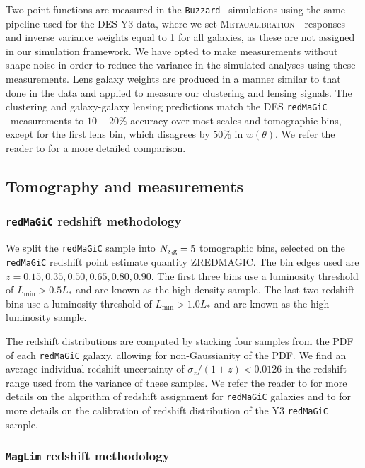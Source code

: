 \documentclass[aps, prd,twocolumn,superscriptaddress,nofootinbib,preprintnumbers]{revtex4-1}
\newcommand{\wtheta}{\ensuremath{w(\theta)}}
\newcommand{\redmagic}{\texttt{redMaGiC} }
\newcommand{\maglim}{\texttt{MagLim} }
\newcommand{\buzzard}{\texttt{Buzzard} }
\newcommand{\metacal}{{\textsc{Metacalibration}~}}
\begin{document}
Two-point functions are measured in the \buzzard\ simulations using the same pipeline used for the DES Y3 data, where we set \metacal\ responses and inverse variance weights equal to 1 for all galaxies, as these are not assigned in our simulation framework. We have opted to make measurements without shape noise in order to reduce the variance in the simulated analyses using these measurements. Lens galaxy weights are produced in a manner similar to that done in the data and applied to measure our clustering and lensing signals. The clustering and galaxy-galaxy lensing predictions match the DES \redmagic\ measurements to $10-20\%$ accuracy over most scales and tomographic bins, except for the first lens bin, which disagrees by $50\%$ in \wtheta. We refer the reader to \citet*{y3-simvalidation} for a more detailed comparison.

\subsection{Tomography and measurements}

\subsubsection{\redmagic redshift methodology}
\label{sec:lensz}
We split the \redmagic sample into $N_{\rm z,g} = 5$ tomographic bins, selected on the \redmagic redshift point estimate quantity ZREDMAGIC. The bin edges used are $z=0.15, 0.35, 0.50, 0.65, 0.80, 0.90$. The first three bins use a luminosity threshold of $L_{\min} > 0.5 L_{*}$ and are known as the high-density sample. The last two redshift bins use a luminosity threshold of $L_{\min} > 1.0 L_{*}$ and are known as the high-luminosity sample.

The redshift distributions are computed by stacking four samples from the PDF of each \redmagic galaxy, allowing for non-Gaussianity of the PDF. We find an average individual redshift uncertainty of $\sigma_z/(1+z) < 0.0126$ in the redshift range used from the variance of these samples. We refer the reader to \citet{Rozo_2016} for more details on the algorithm of redshift assignment for \redmagic galaxies and to \citet{y3-lenswz} for more details on the calibration of redshift distribution of the Y3 \redmagic sample.  

\subsubsection{\maglim redshift methodology}
\end{document}
